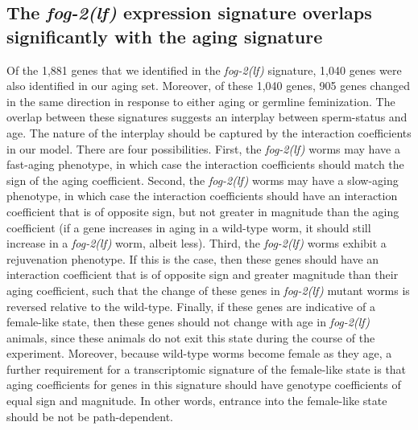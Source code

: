 \documentclass[9pt,twocolumn,twoside]{gsag3jnl}
\newcommand{\fog}{\emph{\mbox{fog-2(lf)}}}
\newcommand{\fogn}{1,881}
\newcommand{\coexpressed}{905}
\newcommand{\intersectn}{1,040}
\begin{document}
\subsection*{The \fog{} expression signature overlaps significantly with the aging
signature}
Of the \fogn{} genes that we identified in the \fog{} signature, \intersectn{}
genes were also identified in our aging set. Moreover, of these \intersectn{}
genes, \coexpressed{} genes changed in the same direction in response to either
aging or germline feminization. The overlap between these signatures suggests an
interplay between sperm-status and age. The nature of the interplay should be
captured by the interaction coefficients in our model. There are four
possibilities. First, the \fog{} worms may have a fast-aging phenotype, in which
case the interaction coefficients should match the sign of the aging
coefficient. Second, the \fog{} worms may have a slow-aging phenotype, in which
case the interaction coefficients should have an interaction coefficient that is
of opposite sign, but not greater in magnitude than the aging coefficient (if a
gene increases in aging in a wild-type worm, it should still increase in a
\fog{} worm, albeit less). Third, the \fog{} worms exhibit a rejuvenation
phenotype. If this is the case, then these genes should have an interaction
coefficient that is of opposite sign and greater magnitude than their aging
coefficient, such that the change of these genes in \fog{} mutant worms is
reversed relative to the wild-type. Finally, if these genes are indicative of a
female-like state, then these genes should not change with age in \fog{} animals,
since these animals do not exit this state during the course of the experiment.
Moreover, because wild-type worms become female as they age, a further
requirement for a transcriptomic signature of the female-like state is that aging
coefficients for genes in this signature should have genotype coefficients of
equal sign and magnitude. In other words, entrance into the female-like state should
be not be path-dependent.
\end{document}
